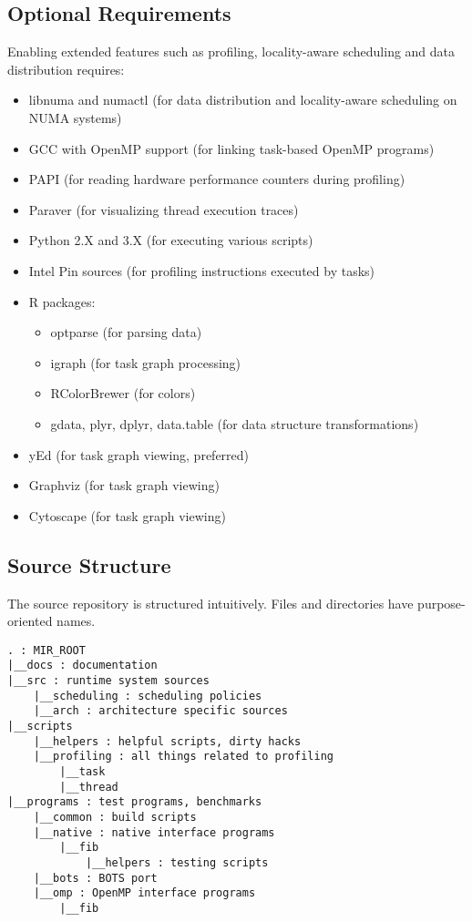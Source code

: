 \documentclass[11pt,a4paper]{article}
\begin{document}
\subsection{Optional Requirements}\label{optional-requirements}

Enabling extended features such as profiling, locality-aware scheduling
and data distribution requires:

\begin{itemize}
\item libnuma and numactl (for data distribution and locality-aware scheduling on NUMA systems)
\item GCC with OpenMP support (for linking task-based OpenMP programs)
\item PAPI (for reading hardware performance counters during profiling)
\item Paraver (for visualizing thread execution traces)
\item Python 2.X and 3.X (for executing various scripts)
\item Intel Pin sources (for profiling instructions executed by tasks)
\item R packages:
  \begin{itemize}
  \item optparse (for parsing data)
  \item igraph (for task graph processing)
  \item RColorBrewer (for colors)
  \item gdata, plyr, dplyr, data.table (for data structure transformations)
  \end{itemize}
\item yEd (for task graph viewing, preferred)
\item Graphviz (for task graph viewing)
\item Cytoscape (for task graph viewing)
\end{itemize}

\subsection{Source Structure}\label{source-structure}

The source repository is structured intuitively. Files and directories have purpose-oriented names.

\begin{lstlisting}[style=MyInputStyle]
. : MIR_ROOT
|__docs : documentation
|__src : runtime system sources
    |__scheduling : scheduling policies
    |__arch : architecture specific sources 
|__scripts 
    |__helpers : helpful scripts, dirty hacks
    |__profiling : all things related to profiling
        |__task 
        |__thread
|__programs : test programs, benchmarks
    |__common : build scripts
    |__native : native interface programs
        |__fib
            |__helpers : testing scripts
    |__bots : BOTS port
    |__omp : OpenMP interface programs
        |__fib
\end{lstlisting}
\end{document}
